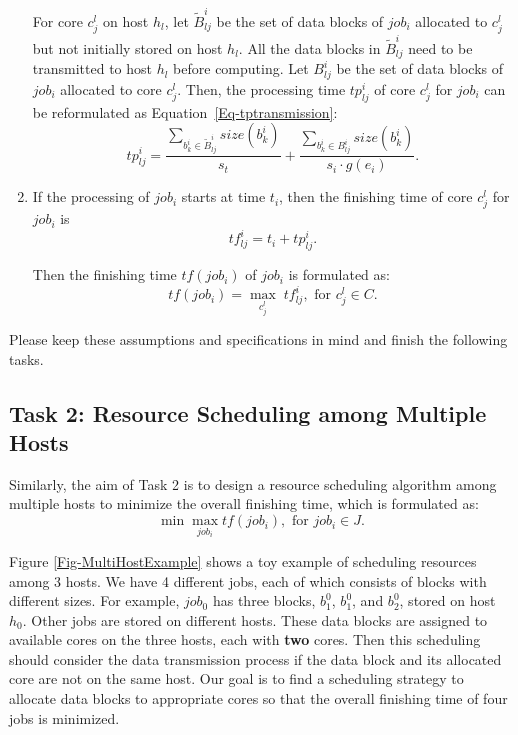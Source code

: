 \documentclass{llncs}
\begin{document}
\begin{enumerate}
  \qquad For core $c^l_j$ on host $h_l$, let $\widetilde{B}^i_{lj}$ be the set of data blocks of $job_i$ allocated to $c^l_j$ but not initially stored on host $h_l$. All the data blocks in $\widetilde{B}^i_{lj}$ need to be transmitted to host $h_l$ before computing. Let $B^i_{lj}$ be the set of data blocks of $job_i$ allocated to core $c^l_j$. Then, the processing time $tp^i_{lj}$ of core $c^l_j$ for $job_i$ can be reformulated as Equation~\eqref{Eq-tptransmission}:
  \begin{equation} \label{Eq-tptransmission}
  tp^i_{lj} = \frac{\sum_{b^i_{k} \in \widetilde{B}^i_{lj}} size(b^i_{k})}{s_t} + \frac{\sum_{b^i_{k} \in B^i_{lj}}size(b^i_{k})}{s_i \cdot g(e_i)}.
  \end{equation}
  
 \item If the processing of $job_i$ starts at time $t_i$, then the finishing time of core $c^l_j$ for $job_i$ is
  \begin{equation*}
  tf^i_{lj} = t_i + tp^i_{lj}.
  \end{equation*}
  
  Then the finishing time $tf(job_i)$ of $job_i$ is formulated as:
  \begin{equation*}
  tf(job_i) = \max_{c^l_j} \; tf^i_{lj}, \text{ for } c^l_j \in C.
  \end{equation*}

\end{enumerate}

Please keep these assumptions and specifications in mind and finish the following tasks.

\subsection{Task 2: Resource Scheduling among Multiple Hosts}

Similarly, the aim of Task 2 is to design a resource scheduling algorithm among multiple hosts to minimize the overall finishing time, which is formulated as:
  \begin{equation*}
  \min \max_{job_i} tf(job_i), \text{ for } job_i \in J.
  \end{equation*}  

Figure \ref{Fig-MultiHostExample} shows a toy example of scheduling resources among 3 hosts. We have 4 different jobs, each of which consists of blocks with different sizes. For example, $job_0$ has three blocks, $b^0_1$, $b^0_1$, and $b^0_2$, stored on host $h_0$. Other jobs are stored on different hosts. These data blocks are assigned to available cores on the three hosts, each with \textbf{two} cores. Then this scheduling should consider the data transmission process if the data block and its allocated core are not on the same host. Our goal is to find a scheduling strategy to allocate data blocks to appropriate cores so that the overall finishing time of four jobs is minimized.
\end{document}
